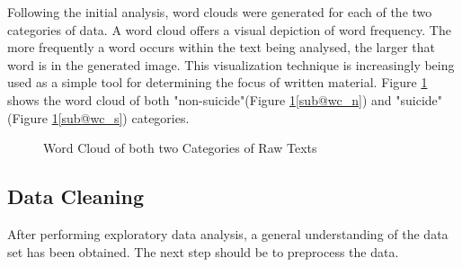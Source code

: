\documentclass[ %
                    author={Louis Wang},
                supervisor={Dr. Qiang Liu},
                    degree={MSc},
                     title={Identification of Suicide Ideation in Texts},
                      type={},
                      year={2024}]{dissertation}
\begin{document}
Following the initial analysis, word clouds were generated for each of the two categories of data. A word cloud offers a visual depiction of word frequency. The more frequently a word occurs within the text being analysed, the larger that word is in the generated image. This visualization technique is increasingly being used as a simple tool for determining the focus of written material.\cite{atenstaedt2012word} Figure \ref{fig:word cloud} shows the word cloud of both "non-suicide"(Figure \ref{fig:word cloud}\ref{sub@wc_n}) and "suicide"(Figure \ref{fig:word cloud}\ref{sub@wc_s}) categories.

\begin{figure}[h]
      \centering
      \hfil
      \caption{Word Cloud of both two Categories of Raw Texts}
      \label{fig:word cloud}
\end{figure}

\subsection{Data Cleaning}
\noindent
After performing exploratory data analysis, a general understanding of the data set has been obtained. The next step should be to preprocess the data.
\end{document}
